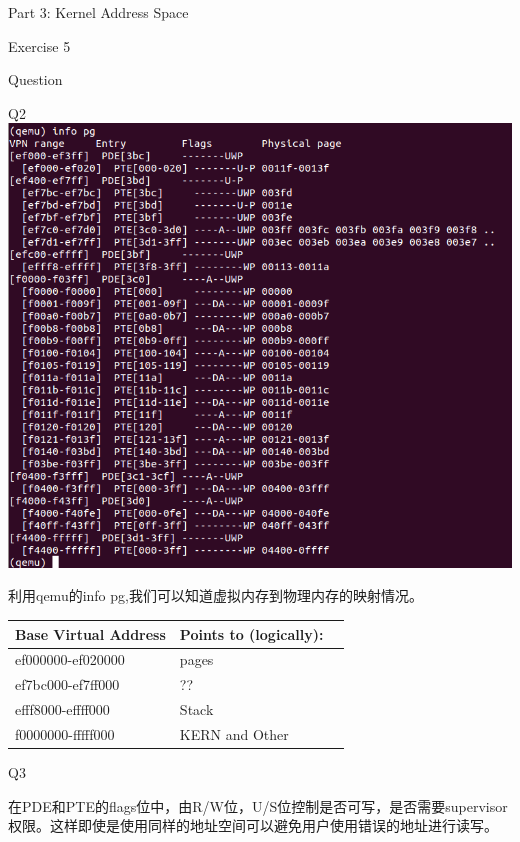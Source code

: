 \documentclass[GBK,winfonts,a4paper,10pt]{ctexart}
\begin{document}
\begin{section}{Part 3: Kernel Address Space}
\begin{subsection}{Exercise 5}
\end{subsection}

\begin{subsection}{Question}
\begin{subsubsection}{Q2}
\includegraphics[scale=0.5]{Ex5infopg.png}
\par
利用qemu的info pg,我们可以知道虚拟内存到物理内存的映射情况。
\begin{center}
    \begin{tabular}{ | l | l | l |}
    \hline
           Base Virtual Address & Points to (logically): \\ \hline
           ef000000-ef020000   &  pages \\ \hline
           ef7bc000-ef7ff000   &  ??    \\ \hline
           efff8000-effff000   &  Stack  \\ \hline
           f0000000-fffff000   &  KERN and Other  \\   
    \hline
    \end{tabular}
\end{center}
\end{subsubsection}

\begin{subsubsection}{Q3}
\par
在PDE和PTE的flags位中，由R/W位，U/S位控制是否可写，是否需要supervisor权限。这样即使是使用同样的地址空间可以避免用户使用错误的地址进行读写。
\end{subsubsection}


\end{subsection}
\end{section}
\end{document}
